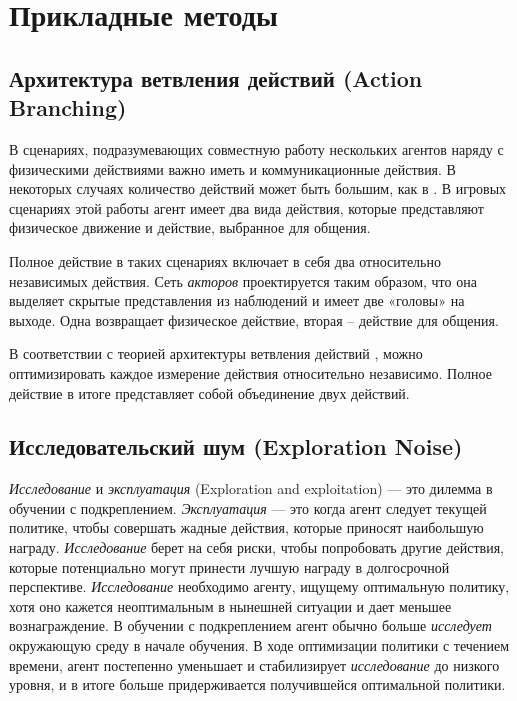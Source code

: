\section{Прикладные методы}

\subsection{Архитектура ветвления действий (Action Branching)}

В сценариях, подразумевающих совместную работу нескольких агентов наряду с физическими действиями важно иметь и коммуникационные действия. В некоторых случаях количество действий может быть большим, как в \cite{tavakoli2017action}. В игровых сценариях этой работы агент имеет два вида действия, которые представляют физическое движение и действие, выбранное для общения.

Полное действие в таких сценариях включает в себя два относительно независимых действия. Сеть \textit{акторов} проектируется таким образом, что она выделяет скрытые представления из наблюдений и имеет две «головы» на выходе. Одна возвращает физическое действие, вторая – действие для общения.

В соответствии с теорией архитектуры ветвления действий \cite{tavakoli2017action}, можно оптимизировать каждое измерение действия относительно независимо. Полное действие в итоге представляет собой объединение двух действий.

\subsection{Исследовательский шум (Exploration Noise)} %

\textit{Исследование} и \textit{эксплуатация} (Exploration and exploitation) — это дилемма в обучении с подкреплением. \textit{Эксплуатация} — это когда агент следует текущей политике, чтобы совершать жадные действия, которые приносят наибольшую награду. \textit{Исследование} берет на себя риски, чтобы попробовать другие действия, которые потенциально могут принести лучшую награду в долгосрочной перспективе. \textit{Исследование} необходимо агенту, ищущему оптимальную политику, хотя оно кажется неоптимальным в нынешней ситуации и дает меньшее вознаграждение. В обучении с подкреплением агент обычно больше \textit{исследует} окружающую среду в начале обучения. В ходе оптимизации политики с течением времени, агент постепенно уменьшает и стабилизирует \textit{исследование} до низкого уровня, и в итоге больше придерживается получившейся оптимальной политики.

